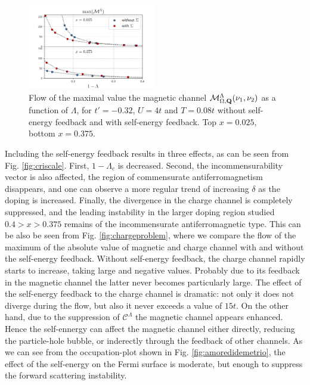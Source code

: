 \begin{figure}
\includegraphics[width=0.50\textwidth]{images/chargeproblem_M_vs_Lambda_diff_occ.png}
\caption{Flow of the maximal value the magnetic channel $\mathcal{M}^\Lambda_{\Omega,\mathbf{Q}}(\nu_1,\nu_2)$ as a function of $\Lambda$, for $t'=-0.32$, $U=4t$ and $T=0.08t$ without self-energy feedback and with self-energy feedback. Top $x=0.025$, bottom $x=0.375$. }
\label{fig:selfeffect}
\end{figure}

Including the self-energy feedback results in three effects, as can be seen from Fig. \ref{fig:criscale}. 
First, $1-\Lambda_c$ is decreased.
Second, the incommensurability vector is also affected, the region of commensurate antiferromagnetism disappears, and one can observe a more regular trend of increasing $\delta$ as the doping is increased.
Finally, the divergence in the charge channel is completely suppressed, and the leading instability in the larger doping region studied  $0.4> x >0.375$ remains of the incommensurate antiferromagnetic type. 
This can be also be seen from Fig. \ref{fig:chargeproblem}, where we compare the flow of the maximum of the absolute value of magnetic and charge channel with and without the self-energy feedback. Without self-energy feedback, the charge channel rapidly starts to increase, taking large and negative values. Probably due to its feedback in the magnetic channel the latter never becomes particularly large.    
The effect of the self-energy feedback to the charge channel is dramatic: not only it does not diverge during the flow, but also it never exceeds a value of $15t$. 
On the other hand, due to the suppression of $\mathcal{C}^\Lambda$ the magnetic channel appears enhanced.
Hence the self-ennergy can affect the magnetic channel either directly, reducing the particle-hole bubble, or inderectly through the feedback of other channels.   
As we can see from the occupation-plot shown in Fig. \ref{fig:amoredidemetrio}, the effect of the self-energy on the Fermi surface is moderate, but enough to suppress the forward scattering instability. 

